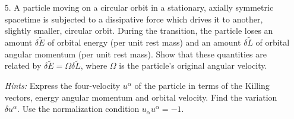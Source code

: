 \documentclass{article}
\begin{document}
\begin{enumerate}
\item[5.] A particle moving on a circular orbit in a stationary, axially symmetric spacetime is subjected to a dissipative force which drives it to another, slightly smaller, circular orbit. During the transition, the particle loses an amount $\delta \tilde{E}$ of orbital energy (per unit rest mass) and an amount $\delta \tilde{L}$ of orbital angular momentum (per unit rest mass). Show that these quantities are related by $\delta\tilde{E} = \Omega \delta\tilde{L}$, where $\Omega$ is the particle's original angular velocity.
  
  {\itshape Hints:} Express the four-velocity $u^\alpha$ of the particle in terms of the Killing vectors, energy angular momentum and orbital velocity. Find the variation $\delta u^\alpha$. Use the normalization condition $u_\alpha u^\alpha = -1$.


\end{enumerate}
\end{document}
